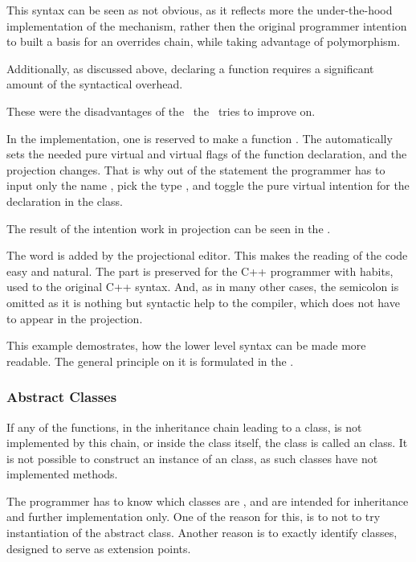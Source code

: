 This syntax can be seen as not obvious, as it reflects more the under-the-hood implementation of the mechanism,
rather then the original programmer intention to built a basis for an overrides chain, while taking advantage of 
polymorphism.

Additionally, as discussed above, declaring a  function requires a significant amount of the syntactical
overhead. 

These were the disadvantages of the \cpppl\ the \pcpp\ tries to improve on.

In the \pcpp implementation, one  is reserved to make a function . The  automatically
sets the needed pure virtual and virtual flags of the function declaration, and the projection changes. That is why out of the 
statement  the programmer has to input only the name , pick the type , and
toggle the pure virtual intention for the declaration in the  class.

The result of the intention work in projection can be seen in the .


The word  is added by the projectional editor. This makes the reading of the code easy and natural.
The  part is preserved for the C++ programmer with habits, used to the original C++ syntax. And, as in many other cases, 
the semicolon is omitted as it is nothing but syntactic help to the compiler, which does not have to appear 
in the projection. 

This example demostrates, how the lower level syntax can be made more readable. The general principle on it is formulated in
the .

\subsubsection{Abstract Classes}
\label{abstractclasses}

If any of the  functions, in the inheritance chain leading to a class, is not implemented by this chain, 
or inside the class itself, the class is called an  class. It is not possible to construct an instance of an
 class, as such classes have not implemented methods.

The programmer has to know which classes are ,
and are intended for inheritance and further implementation only. One of the reason for this, is to not to try instantiation of
the abstract class. Another reason is to exactly identify  classes, designed to serve as extension points.


